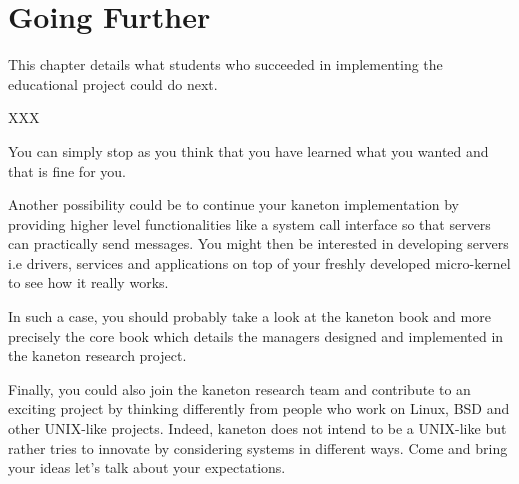 %
%
%
%
%
%

%
%

\chapter{Going Further}
\label{chapter:further}

This chapter details what students who succeeded in implementing the
 educational project could do next.

\newpage

%
%

XXX

   You can simply stop as you think that you have learned what you
wanted and that is fine for you.

   Another possibility could be to continue your kaneton
implementation by providing higher level functionalities like a system
call interface so that servers can practically send messages. You
might then be interested in developing servers i.e drivers, services
and applications on top of your freshly developed micro-kernel to see
how it really works.

   In such a case, you should probably take a look at the kaneton
book and more precisely the core book which details the managers
designed and implemented in the kaneton research project.

   Finally, you could also join the kaneton research team and
contribute to an exciting project by thinking differently from people
who work on Linux, BSD and other UNIX-like projects. Indeed, kaneton
does not intend to be a UNIX-like but rather tries to innovate by
considering systems in different ways. Come and bring your ideas let's
talk about your expectations.
